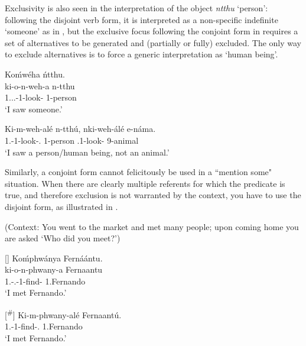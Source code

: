 \documentclass[output=paper]{langscibook}
\begin{document}
\z

Exclusivity is also seen in the interpretation of the object \textit{ntthu} ‘person’: following the disjoint verb form, it is interpreted as a non-specific indefinite ‘someone’ as in , but the exclusive focus following the conjoint form in  requires a set of alternatives to be generated and (partially or fully) excluded. The only way to exclude alternatives is to force a generic interpretation as ‘human being’.

\ea
\label{bkm:Ref95808158}
\ea
\label{bkm:Ref95808158:a}
\begin{xlist}
\exi{\DJ{}}
Koḿwéha ńtthu.\\
\gll
ki-o-n-weh-a  n-tthu\\
1\SG{}.\SM{}.\PFV{}.\DJ{}-1\OM{}-look-\FV{}  1-person\\
\glt
‘I saw someone.’\\

\end{xlist}

\ex
\label{bkm:Ref95808158:b}
\begin{xlist}
\exi{\CJ{}}
\gll
Ki-m-weh-alé  n-tthú,  nki-weh-álé  e-náma.\\
1\SG{}.\SM{}-1\OM{}-look-\PFV{}.\CJ{}  1-person  \NEG{}.1\SG{}-look-\PFV{}  9-animal\\
\glt
‘I saw a person/human being, not an animal.’ \citep[1740]{vanderWal2011}\\
\end{xlist}

\z
\z

Similarly, a conjoint form cannot felicitously be used in a ``mention some" situation. When there are clearly multiple referents for which the predicate is true, and therefore exclusion is not warranted by the context, you have to use the disjoint form, as illustrated in .

\ea
\label{bkm:Ref129265860}\label{bkm:Ref109479522}(Context: You went to the market and met many people; upon coming home you are asked ‘Who did you meet?’)

\begin{xlist}
\exi{\DJ{}}
[]{
Ko\'{m}phwánya Fernáántu.\\
\gll
ki-o-n-phwany-a  Fernaantu\\
1\SG{}.\SM{}-\PFV{}.\DJ{}-1\OM{}-find-\FV{}  1.Fernando\\
\glt
‘I met Fernando.’\\
}

\exi{\CJ{}}
[\textsuperscript{\#}]{
\gll
Ki{}-m{}-phwany{}-alé  Fernaantú.\\
1\SG{}.\SM{}-1\OM{}-find-\PFV{}.\CJ{}  1.Fernando\\
\glt
‘I met Fernando.’\\
}
\end{xlist}
\end{document}
